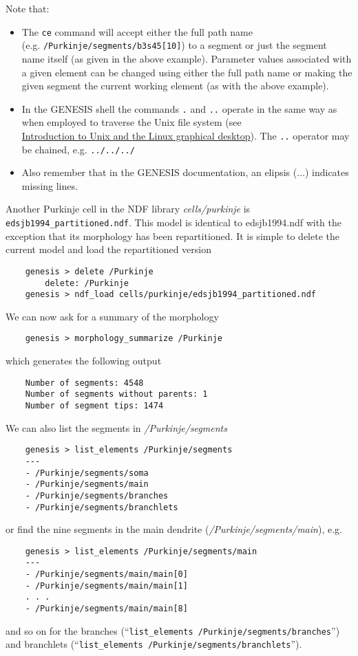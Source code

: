 \documentclass[12pt]{article}
\begin{document}
Note that:
\begin{itemize}

\item The {\tt ce} command will accept either the full path name\\(e.g. {\tt  /Purkinje/segments/b3s45[10]}) to a segment or just the segment name itself (as given in the above example).  Parameter values associated with a given element can be changed using either the full path name or making the given segment the current working element (as with the above example).

\item In the GENESIS shell the commands {\tt .} and {\tt ..} operate in the same way as when employed to traverse the Unix file system (see \\\href{../unix-linux/unix-linux.tex}{Introduction to Unix and the Linux graphical desktop}). The {\tt ..} operator may be chained, e.g. {\tt ../../../}

\item Also remember that in the GENESIS documentation, an elipsis ($\ldots$) indicates missing lines.

\end{itemize}

Another Purkinje cell in the NDF library {\it cells/purkinje} is {\tt edsjb1994\_partitioned.ndf}. This model is identical to edsjb1994.ndf with the exception that its morphology has been repartitioned. It is simple to delete the current model and load the repartitioned version
\begin{verbatim}
    genesis > delete /Purkinje
        delete: /Purkinje
    genesis > ndf_load cells/purkinje/edsjb1994_partitioned.ndf
\end{verbatim}
We can now ask for a summary of the morphology
\begin{verbatim}
    genesis > morphology_summarize /Purkinje
\end{verbatim}
which generates the following output
\begin{verbatim}
    Number of segments: 4548
    Number of segments without parents: 1
    Number of segment tips: 1474
\end{verbatim}
We can also list the segments in {\it /Purkinje/segments}
\begin{verbatim}
    genesis > list_elements /Purkinje/segments
    ---
    - /Purkinje/segments/soma
    - /Purkinje/segments/main
    - /Purkinje/segments/branches
    - /Purkinje/segments/branchlets
\end{verbatim}
or find the nine segments in the main dendrite ({\it /Purkinje/segments/main}), e.g.
\begin{verbatim}
    genesis > list_elements /Purkinje/segments/main
    ---
    - /Purkinje/segments/main/main[0]
    - /Purkinje/segments/main/main[1]
    . . . 
    - /Purkinje/segments/main/main[8]
\end{verbatim}
and so on for the branches (``{\tt list\_elements /Purkinje/segments/branches}'') and branchlets (``{\tt list\_elements /Purkinje/segments/branchlets}'').
\end{document}
